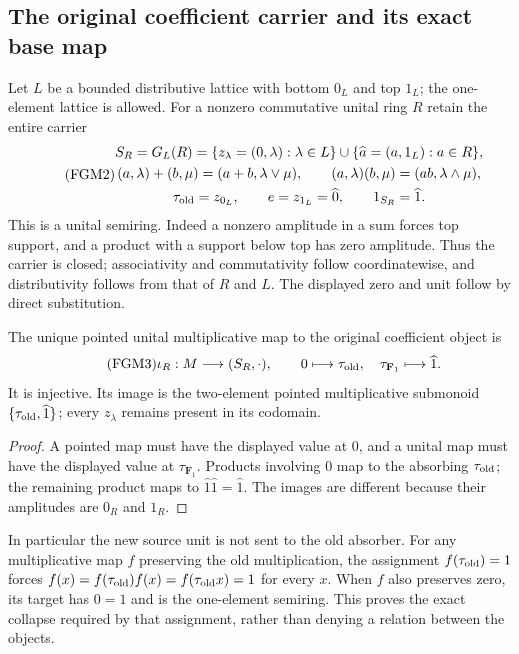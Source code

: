 \subsection{The original coefficient carrier and its exact base map}
Let $L$ be a bounded distributive lattice with bottom $0_L$ and top $1_L$;
the one-element lattice is allowed. For a nonzero commutative unital
ring $R$ retain the entire carrier
\begin{equation}\tag{FGM2}
 \begin{gathered}
 S_R=G_L(R)=\{z_\lambda=(0,\lambda):\lambda\in L\}
            \cup\{\widehat a=(a,1_L):a\in R\},\\
 (a,\lambda)+(b,\mu)=(a+b,\lambda\vee\mu),\qquad
 (a,\lambda)(b,\mu)=(ab,\lambda\wedge\mu),\\
 \tau_{\rm old}=z_{0_L},\qquad e=z_{1_L}=\widehat0,
 \qquad 1_{S_R}=\widehat1.
 \end{gathered}
\end{equation}
This is a unital semiring. Indeed a nonzero amplitude in a sum forces
top support, and a product with a support below top has zero amplitude.
Thus the carrier is closed; associativity and commutativity follow
coordinatewise, and distributivity follows from that of $R$ and $L$.
The displayed zero and unit follow by direct substitution.

\begin{proposition}
The unique pointed unital multiplicative map to the original coefficient
object is
\begin{equation}\tag{FGM3}
 \iota_R:M\longrightarrow(S_R,\cdot),\qquad
 0\longmapsto\tau_{\rm old},\quad
 \tau_{\mathbf F_1}\longmapsto\widehat1.
\end{equation}
It is injective. Its image is the two-element pointed multiplicative
submonoid $\{\tau_{\rm old},\widehat1\}$; every $z_\lambda$ remains
present in its codomain.
\end{proposition}
\begin{proof}
A pointed map must have the displayed value at $0$, and a unital map
must have the displayed value at $\tau_{\mathbf F_1}$. Products involving
$0$ map to the absorbing $\tau_{\rm old}$; the remaining product maps
to $\widehat1\widehat1=\widehat1$. The images are different because
their amplitudes are $0_R$ and $1_R$.
\end{proof}
In particular the new source unit is not sent to the old absorber.
For any multiplicative map $f$ preserving the old multiplication,
the assignment $f(\tau_{\rm old})=1$ forces
$f(x)=f(\tau_{\rm old})f(x)=f(\tau_{\rm old}x)=1$ for every $x$.
When $f$ also preserves zero, its target has $0=1$ and is the
one-element semiring. This proves the exact collapse required by that
assignment, rather than denying a relation between the objects.

